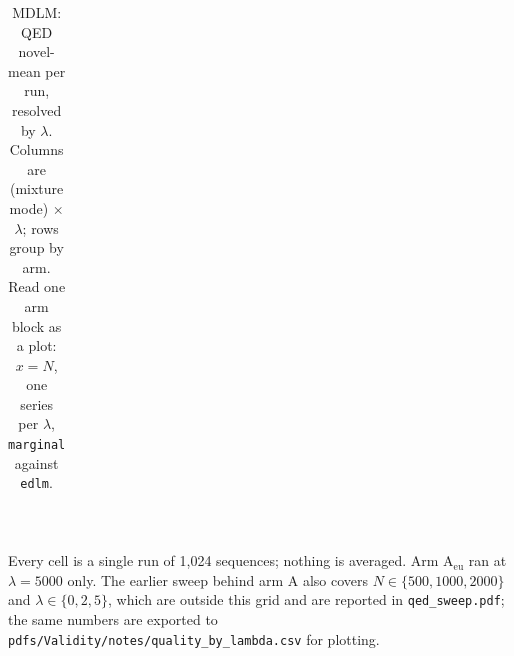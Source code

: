 \documentclass[11pt]{article}
\begin{document}
\begin{table}[htbp]
{\begin{tabular}{lrrrrrrrrrrr}
\bottomrule
\end{tabular}}
\\[0.4em] \begin{minipage}{0.92\textwidth}\footnotesize Every cell is a single run of 1{,}024 sequences; nothing is averaged. Arm A$_{\mathrm{eu}}$ ran at $\lambda = 5000$ only. The earlier sweep behind arm A also covers $N \in \{500, 1000, 2000\}$ and $\lambda \in \{0, 2, 5\}$, which are outside this grid and are reported in \texttt{qed\_sweep.pdf}; the same numbers are exported to \texttt{pdfs/Validity/notes/quality\_by\_lambda.csv} for plotting.\end{minipage}
\caption{MDLM: QED novel-mean per run, resolved by $\lambda$. Columns are (mixture mode) $\times$ $\lambda$; rows group by arm. Read one arm block as a plot: $x = N$, one series per $\lambda$, \texttt{marginal} against \texttt{edlm}.}
\label{tab:ov-prop-lambda-MDLM}
\end{table}
\end{document}
